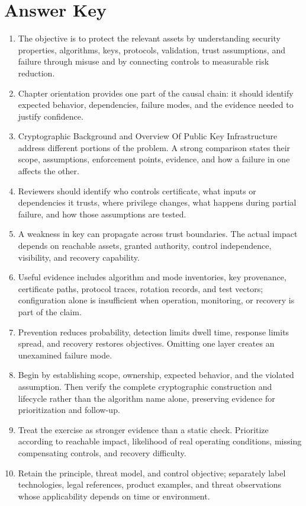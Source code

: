 \documentclass[11pt,letterpaper]{article}
\begin{document}
\section*{Answer Key}
\begin{enumerate}
\item The objective is to protect the relevant assets by understanding security properties, algorithms, keys, protocols, validation, trust assumptions, and failure through misuse and by connecting controls to measurable risk reduction.
\item Chapter orientation provides one part of the causal chain: it should identify expected behavior, dependencies, failure modes, and the evidence needed to justify confidence.
\item Cryptographic Background and Overview Of Public Key Infrastructure address different portions of the problem. A strong comparison states their scope, assumptions, enforcement points, evidence, and how a failure in one affects the other.
\item Reviewers should identify who controls certificate, what inputs or dependencies it trusts, where privilege changes, what happens during partial failure, and how those assumptions are tested.
\item A weakness in key can propagate across trust boundaries. The actual impact depends on reachable assets, granted authority, control independence, visibility, and recovery capability.
\item Useful evidence includes algorithm and mode inventories, key provenance, certificate paths, protocol traces, rotation records, and test vectors; configuration alone is insufficient when operation, monitoring, or recovery is part of the claim.
\item Prevention reduces probability, detection limits dwell time, response limits spread, and recovery restores objectives. Omitting one layer creates an unexamined failure mode.
\item Begin by establishing scope, ownership, expected behavior, and the violated assumption. Then verify the complete cryptographic construction and lifecycle rather than the algorithm name alone, preserving evidence for prioritization and follow-up.
\item Treat the exercise as stronger evidence than a static check. Prioritize according to reachable impact, likelihood of real operating conditions, missing compensating controls, and recovery difficulty.
\item Retain the principle, threat model, and control objective; separately label technologies, legal references, product examples, and threat observations whose applicability depends on time or environment.
\end{enumerate}
\end{document}

